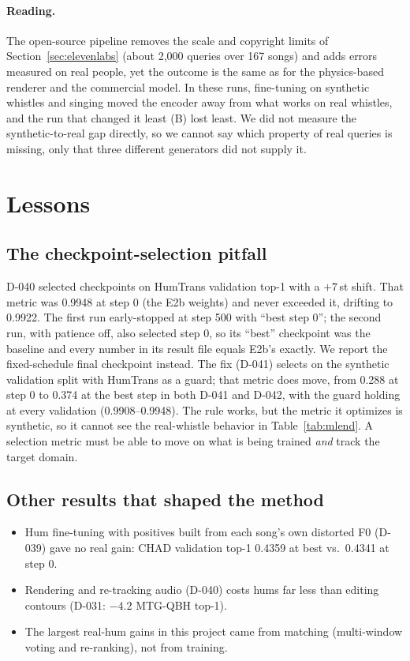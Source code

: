 \documentclass[11pt]{article}
\newcommand{\st}{\,st}
\begin{document}
\paragraph{Reading.} The open-source pipeline removes the scale and copyright limits of Section~\ref{sec:elevenlabs} (about 2,000 queries over 167 songs) and adds errors measured on real people, yet the outcome is the same as for the physics-based renderer and the commercial model. In these runs, fine-tuning on synthetic whistles and singing moved the encoder away from what works on real whistles, and the run that changed it least (B) lost least. We did not measure the synthetic-to-real gap directly, so we cannot say which property of real queries is missing, only that three different generators did not supply it.

\section{Lessons}\label{sec:lessons}

\subsection{The checkpoint-selection pitfall}\label{sec:selection}
D-040 selected checkpoints on HumTrans validation top-1 with a $+7$\st{} shift. That metric was 0.9948 at step 0 (the E2b weights) and never exceeded it, drifting to 0.9922. The first run early-stopped at step 500 with ``best step 0''; the second run, with patience off, also selected step 0, so its ``best'' checkpoint was the baseline and every number in its result file equals E2b's exactly. We report the fixed-schedule final checkpoint instead. The fix (D-041) selects on the synthetic validation split with HumTrans as a guard; that metric does move, from 0.288 at step 0 to 0.374 at the best step in both D-041 and D-042, with the guard holding at every validation (0.9908--0.9948). The rule works, but the metric it optimizes is synthetic, so it cannot see the real-whistle behavior in Table~\ref{tab:mlend}. A selection metric must be able to move on what is being trained \emph{and} track the target domain.

\subsection{Other results that shaped the method}
\begin{itemize}
\item Hum fine-tuning with positives built from each song's own distorted F0 (D-039) gave no real gain: CHAD validation top-1 0.4359 at best vs.\ 0.4341 at step 0.
\item Rendering and re-tracking audio (D-040) costs hums far less than editing contours (D-031: $-4.2$ MTG-QBH top-1).
\item The largest real-hum gains in this project came from matching (multi-window voting and re-ranking), not from training.
\end{itemize}
\end{document}
